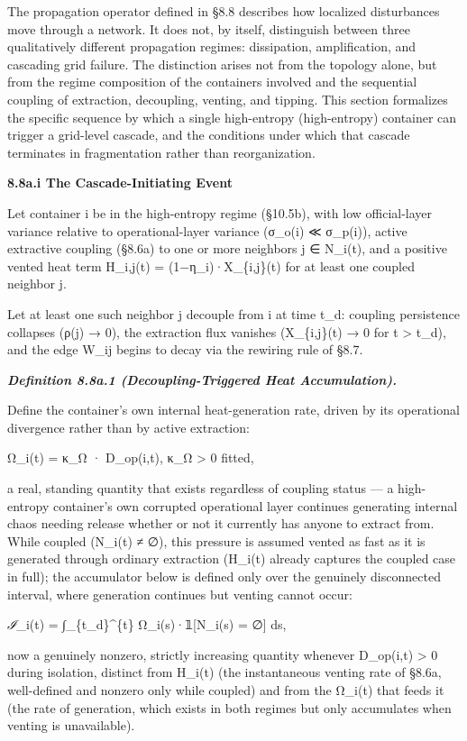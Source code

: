 \documentclass[
]{article}
\begin{document}
The propagation operator defined in §8.8 describes how localized
disturbances move through a network. It does not, by itself, distinguish
between three qualitatively different propagation regimes: dissipation,
amplification, and cascading grid failure. The distinction arises not
from the topology alone, but from the regime composition of the
containers involved and the sequential coupling of extraction,
decoupling, venting, and tipping. This section formalizes the specific
sequence by which a single high-entropy (high-entropy) container can
trigger a grid-level cascade, and the conditions under which that
cascade terminates in fragmentation rather than reorganization.

\textbf{8.8a.i The Cascade-Initiating Event}

Let container i be in the high-entropy regime (§10.5b), with low
official-layer variance relative to operational-layer variance (σ\_o(i)
≪ σ\_p(i)), active extractive coupling (§8.6a) to one or more neighbors
j ∈ N\_i(t), and a positive vented heat term H\_i,j(t) =
(1−η\_i)·X\_\{i,j\}(t) for at least one coupled neighbor j.

Let at least one such neighbor j decouple from i at time t\_d: coupling
persistence collapses (ρ(j) → 0), the extraction flux vanishes
(X\_\{i,j\}(t) → 0 for t \textgreater{} t\_d), and the edge W\_ij begins
to decay via the rewiring rule of §8.7.

\emph{\textbf{Definition 8.8a.1 (Decoupling-Triggered Heat
Accumulation).}}

Define the container's own internal heat-generation rate, driven by its
operational divergence rather than by active extraction:

Ω\_i(t) = κ\_Ω · D\_op(i,t), κ\_Ω \textgreater{} 0 fitted,

a real, standing quantity that exists regardless of coupling status ---
a high-entropy container's own corrupted operational layer continues
generating internal chaos needing release whether or not it currently
has anyone to extract from. While coupled (N\_i(t) ≠ ∅), this pressure
is assumed vented as fast as it is generated through ordinary extraction
(H\_i(t) already captures the coupled case in full); the accumulator
below is defined only over the genuinely disconnected interval, where
generation continues but venting cannot occur:

\emph{ℐ}\_i(t) = ∫\_\{t\_d\}\^{}\{t\} Ω\_i(s)·𝟙{[}N\_i(s) = ∅{]} ds,

now a genuinely nonzero, strictly increasing quantity whenever
D\_op(i,t) \textgreater{} 0 during isolation, distinct from H\_i(t) (the
instantaneous venting rate of §8.6a, well-defined and nonzero only while
coupled) and from the Ω\_i(t) that feeds it (the rate of generation,
which exists in both regimes but only accumulates when venting is
unavailable).
\end{document}
